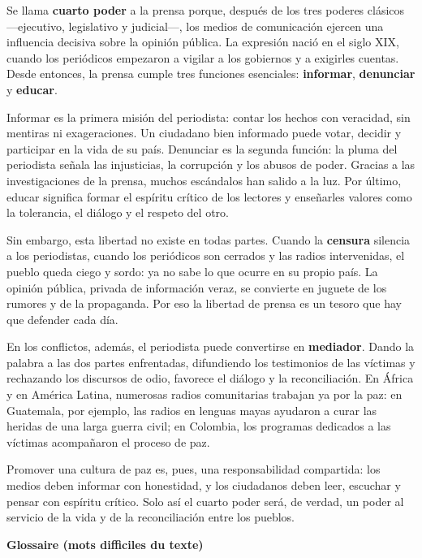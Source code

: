 \documentclass[11pt]{article}
\begin{document}
\begin{textebox}
Se llama \textbf{cuarto poder} a la prensa porque, después de los tres poderes clásicos —ejecutivo, legislativo y judicial—, los medios de comunicación ejercen una influencia decisiva sobre la opinión pública. La expresión nació en el siglo XIX, cuando los periódicos empezaron a vigilar a los gobiernos y a exigirles cuentas. Desde entonces, la prensa cumple tres funciones esenciales: \textbf{informar}, \textbf{denunciar} y \textbf{educar}.

Informar es la primera misión del periodista: contar los hechos con veracidad, sin mentiras ni exageraciones. Un ciudadano bien informado puede votar, decidir y participar en la vida de su país. Denunciar es la segunda función: la pluma del periodista señala las injusticias, la corrupción y los abusos de poder. Gracias a las investigaciones de la prensa, muchos escándalos han salido a la luz. Por último, educar significa formar el espíritu crítico de los lectores y enseñarles valores como la tolerancia, el diálogo y el respeto del otro.

Sin embargo, esta libertad no existe en todas partes. Cuando la \textbf{censura} silencia a los periodistas, cuando los periódicos son cerrados y las radios intervenidas, el pueblo queda ciego y sordo: ya no sabe lo que ocurre en su propio país. La opinión pública, privada de información veraz, se convierte en juguete de los rumores y de la propaganda. Por eso la libertad de prensa es un tesoro que hay que defender cada día.

En los conflictos, además, el periodista puede convertirse en \textbf{mediador}. Dando la palabra a las dos partes enfrentadas, difundiendo los testimonios de las víctimas y rechazando los discursos de odio, favorece el diálogo y la reconciliación. En África y en América Latina, numerosas radios comunitarias trabajan ya por la paz: en Guatemala, por ejemplo, las radios en lenguas mayas ayudaron a curar las heridas de una larga guerra civil; en Colombia, los programas dedicados a las víctimas acompañaron el proceso de paz.

Promover una cultura de paz es, pues, una responsabilidad compartida: los medios deben informar con honestidad, y los ciudadanos deben leer, escuchar y pensar con espíritu crítico. Solo así el cuarto poder será, de verdad, un poder al servicio de la vida y de la reconciliación entre los pueblos.
\end{textebox}

\textbf{Glossaire (mots difficiles du texte)}
\end{document}
